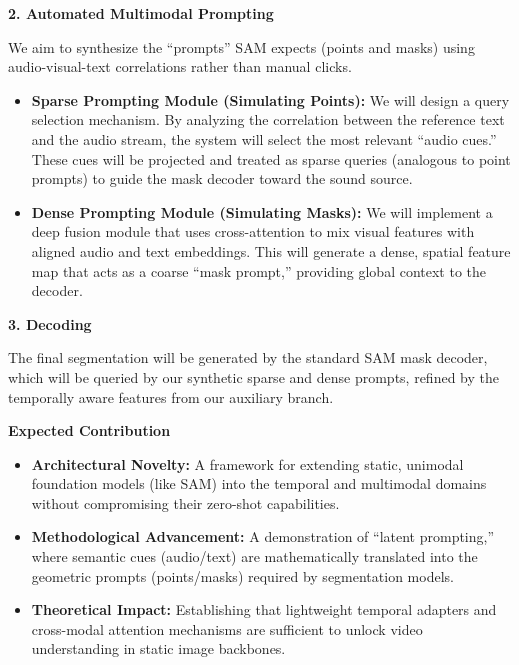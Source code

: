 \vspace{0.5em}
\noindent\textbf{2. Automated Multimodal Prompting}

We aim to synthesize the ``prompts'' SAM expects (points and masks) using audio-visual-text correlations rather than manual clicks.
\begin{itemize}
    \item \textbf{Sparse Prompting Module (Simulating Points):} We will design a query selection mechanism. By analyzing the correlation between the reference text and the audio stream, the system will select the most relevant ``audio cues.'' These cues will be projected and treated as sparse queries (analogous to point prompts) to guide the mask decoder toward the sound source.
    \item \textbf{Dense Prompting Module (Simulating Masks):} We will implement a deep fusion module that uses cross-attention to mix visual features with aligned audio and text embeddings. This will generate a dense, spatial feature map that acts as a coarse ``mask prompt,'' providing global context to the decoder.
\end{itemize}

\vspace{0.5em}
\noindent\textbf{3. Decoding}

The final segmentation will be generated by the standard SAM mask decoder, which will be queried by our synthetic sparse and dense prompts, refined by the temporally aware features from our auxiliary branch.

\vspace{1em}
\noindent\textbf{Expected Contribution}

\begin{itemize}
    \item \textbf{Architectural Novelty:} A framework for extending static, unimodal foundation models (like SAM) into the temporal and multimodal domains without compromising their zero-shot capabilities.
    \item \textbf{Methodological Advancement:} A demonstration of ``latent prompting,'' where semantic cues (audio/text) are mathematically translated into the geometric prompts (points/masks) required by segmentation models.
    \item \textbf{Theoretical Impact:} Establishing that lightweight temporal adapters and cross-modal attention mechanisms are sufficient to unlock video understanding in static image backbones.
\end{itemize}